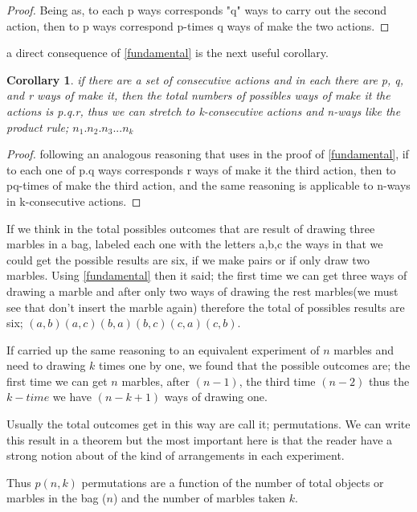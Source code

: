 \documentclass[10pt,a4paper]{article}
\newtheorem{corollary}{Corollary}[theorem]
\begin{document}
\begin{proof}
Being as, to each p ways corresponds "q" ways to carry out the second action, then to p ways correspond p-times q ways of make the two actions. 
\end{proof}

 a direct consequence of \ref{fundamental} is the next useful corollary.
 
\begin{corollary}
 
if there are a set of consecutive actions and in each there are p, q, and r ways of make it, then the total numbers of possibles ways of make it the actions is p.q.r, thus we can stretch to k-consecutive actions and n-ways like the product rule; $n_{1}.n_{2}.n_{3}...n_{k}$

\end{corollary}

\begin{proof}
following an analogous reasoning that uses in the proof of \ref{fundamental}, if to each one of p.q ways corresponds r ways of make it the third action, then to pq-times of make the third action, and  the same reasoning is applicable to n-ways in k-consecutive actions.

\end{proof}

 
If we think in the total possibles outcomes that are result  of drawing  three marbles in a bag, labeled each one with the letters a,b,c the ways in that we could get the possible results are six, if we make pairs or if only draw two marbles. Using \ref{fundamental} then it said; the first time we can get three ways of drawing a marble and after only two ways  of drawing the rest marbles(we must see that don't insert the marble again) therefore the total of possibles results are six; $(a,b)(a,c)(b,a)(b,c)(c,a)(c,b).$


If carried up the same reasoning to an equivalent experiment of  $n$ marbles and need to drawing $k$ times one by one, we found that the possible outcomes are; the first time we can get $n$ marbles, after $(n-1)$, the third time $(n-2)$ thus the $k-time$ we have $(n-k+1)$ ways of drawing one.


Usually the total outcomes get in this way are call it; permutations.  We can write this result in a theorem but the most important here is that the reader have a strong notion about of the kind of arrangements in each experiment.

Thus $p(n,k)$ permutations are a function of the number of total objects or marbles in the bag ($n$) and the number of marbles taken $k$.
\end{document}

